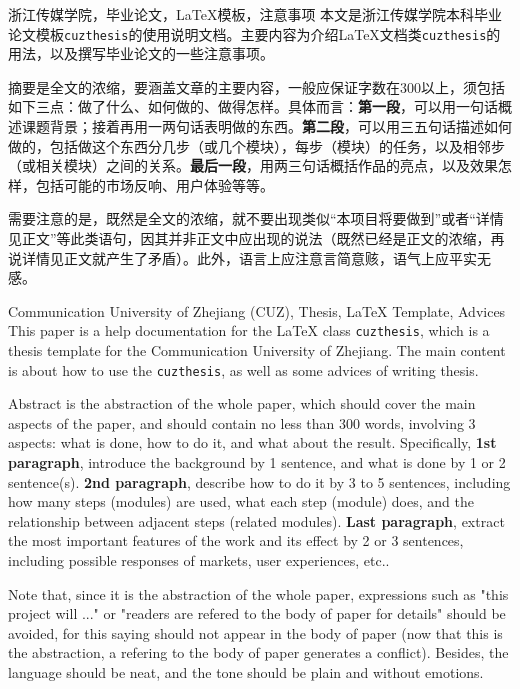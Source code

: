 \begin{chineseabstract}
    {浙江传媒学院，毕业论文，\LaTeX{}模板，注意事项}
    本文是浙江传媒学院本科毕业论文模板\texttt{cuzthesis}的使用说明文档。主要内容为介绍\LaTeX{}文档类\texttt{cuzthesis}的用法，以及撰写毕业论文的一些注意事项。

    摘要是全文的浓缩，要涵盖文章的主要内容，一般应保证字数在300以上，须包括如下三点：做了什么、如何做的、做得怎样。具体而言：\textbf{第一段}，可以用一句话概述课题背景；接着再用一两句话表明做的东西。\textbf{第二段}，可以用三五句话描述如何做的，包括做这个东西分几步（或几个模块），每步（模块）的任务，以及相邻步（或相关模块）之间的关系。\textbf{最后一段}，用两三句话概括作品的亮点，以及效果怎样，包括可能的市场反响、用户体验等等。
    
    需要注意的是，既然是全文的浓缩，就不要出现类似“本项目将要做到”或者“详情见正文”等此类语句，因其并非正文中应出现的说法（既然已经是正文的浓缩，再说详情见正文就产生了矛盾）。此外，语言上应注意言简意赅，语气上应平实无感。
\end{chineseabstract}
\begin{englishabstract}
    {Communication University of Zhejiang (CUZ), Thesis, \LaTeX{} Template, Advices}
    This paper is a help documentation for the \LaTeX{} class \texttt{cuzthesis}, which is a thesis template for the Communication University of Zhejiang. The main content is about how to use the \texttt{cuzthesis}, as well as some advices of writing thesis.

    Abstract is the abstraction of the whole paper, which should cover the main aspects of the paper, and should contain no less than 300 words, involving 3 aspects: what is done, how to do it, and what about the result. Specifically, \textbf{1st paragraph}, introduce the background by 1 sentence, and what is done by 1 or 2 sentence(s). \textbf{2nd paragraph}, describe how to do it by 3 to 5 sentences, including how many steps (modules) are used, what each step (module) does, and the relationship between adjacent steps (related modules). \textbf{Last paragraph}, extract the most important features of the work and its effect by 2 or 3 sentences, including possible responses of markets, user experiences, etc..
	
	Note that, since it is the abstraction of the whole paper, expressions such as "this project will ..." or "readers are refered to the body of paper for details" should be avoided, for this saying should not appear in the body of paper (now that this is the abstraction, a refering to the body of paper generates a conflict). Besides, the language should be neat, and the tone should be plain and without emotions.
\end{englishabstract}